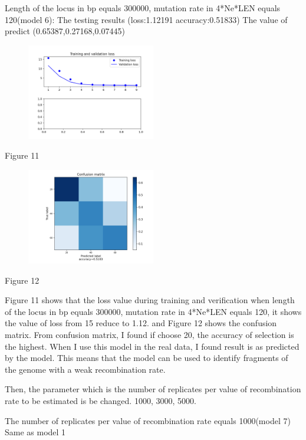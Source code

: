 \documentclass[11pt,a4 paper,title page]{article}
\begin{document}
Length of the locus in bp equals 300000, mutation rate in 4*Ne*LEN equals 120(model 6):
\hfill\break 
The testing results (loss:1.12191 accuracy:0.51833)
\hfill\break 
The value of predict (0.65387,0.27168,0.07445)
\begin{figure}[H]
\centering
\includegraphics[width=0.5\textwidth,angle=360]{../picture/figure11.png}
\end{figure}
\centerline{Figure 11}
\hfill\break 
\begin{figure}[H]
\centering
\includegraphics[width=0.5\textwidth,angle=360]{../picture/figure12.png}
\end{figure}
\centerline{Figure 12}
\hfill\break
Figure 11 shows that the loss value during training and verification when length of the locus in bp equals 300000, mutation rate in 4*Ne*LEN equals 120, it shows the value of loss from 15 reduce to 1.12. and Figure 12 shows the confusion matrix. From confusion matrix, I found if choose 20, the accuracy of selection is the highest. When I use this model in the real data, I found result is as predicted by the model. This means that the model can be used to identify fragments of the genome with a weak recombination rate.
\hfill\break

Then, the parameter which is the number of replicates per value of recombination rate to be estimated is be changed. 1000, 3000, 5000.
\hfill\break

The number of replicates per value of recombination rate equals 1000(model 7)
\hfill\break 
Same as model 1
\hfill\break
\end{document}
